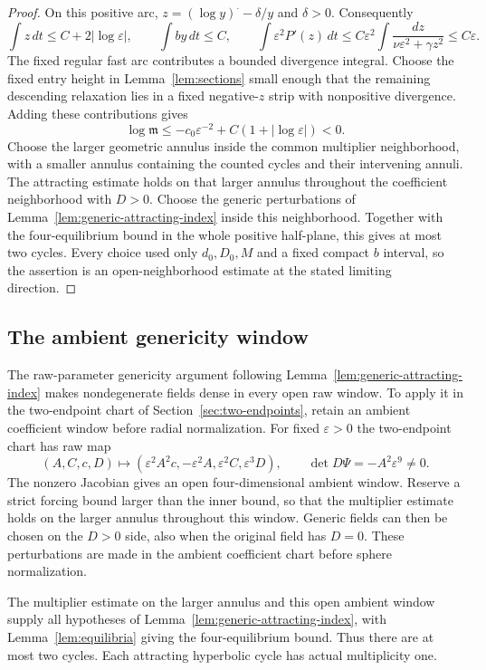 \begin{proof}
On this positive arc, $z=(\log y)^{\displaystyle\cdot}-\delta/y$
and $\delta>0$. Consequently
\[
 \int z\,dt\le C+2|\log\varepsilon|,\qquad
 \int by\,dt\le C,\qquad
 \int\varepsilon^2P'(z)\,dt
 \le C\varepsilon^2\int\frac{dz}{\nu\varepsilon^2+\gamma z^2}\le C\varepsilon.
\]
The fixed regular fast arc contributes a bounded divergence integral.
Choose the fixed entry height in Lemma~\ref{lem:sections} small enough
that the remaining descending relaxation lies in a fixed negative-$z$
strip with nonpositive divergence. Adding these contributions gives
\[
 \log\mathfrak m\le-c_0\varepsilon^{-2}
                              +C(1+|\log\varepsilon|)<0.
\]
Choose the larger geometric annulus inside the common multiplier
neighborhood, with a smaller annulus containing the counted cycles and
their intervening annuli.  The attracting estimate holds on that larger
annulus throughout the coefficient neighborhood with $D>0$.
Choose the generic perturbations of
Lemma~\ref{lem:generic-attracting-index} inside this neighborhood.
Together with the four-equilibrium bound in the whole positive half-plane,
this gives at most two cycles.
Every choice used only $d_0,D_0,M$ and a fixed compact $b$ interval,
so the assertion is an open-neighborhood estimate at the stated
limiting direction.
\end{proof}

\subsection{The ambient genericity window}
\label{sec:ambient-genericity-window}
The raw-parameter genericity argument following
Lemma~\ref{lem:generic-attracting-index} makes nondegenerate fields dense
in every open raw window. To apply it in the two-endpoint chart of
Section~\ref{sec:two-endpoints}, retain an ambient coefficient
window before radial normalization.
For fixed $\varepsilon>0$ the two-endpoint chart has raw map
\[
 (A,C,c,D)\mapsto
 (\varepsilon^2A^2c,-\varepsilon^2A,
                  \varepsilon^2C,\varepsilon^3D),
 \qquad \det D\Psi=-A^2\varepsilon^9\ne0 .
\]
The nonzero Jacobian gives an open four-dimensional ambient window.
Reserve a strict forcing bound larger than the inner bound, so that the
multiplier estimate holds on the larger annulus throughout this window.
Generic fields can then be chosen on the $D>0$ side, also when the
original field has $D=0$. These perturbations are made in the ambient
coefficient chart before sphere normalization.

The multiplier estimate on the larger annulus and this open ambient
window supply all hypotheses of Lemma~\ref{lem:generic-attracting-index},
with Lemma~\ref{lem:equilibria} giving the four-equilibrium bound.
Thus there are at most two cycles.
Each attracting hyperbolic cycle has actual multiplicity one.

